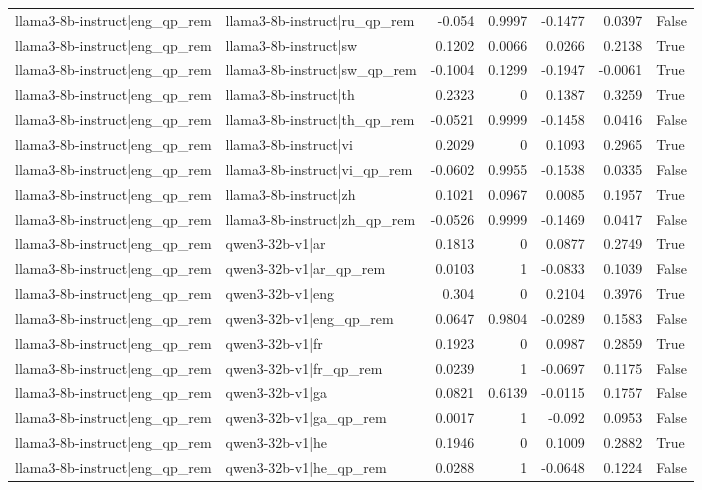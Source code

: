 \begin{table}
\begin{tabular}{l l r r r r l}
llama3-8b-instruct|eng_qp_rem & llama3-8b-instruct|ru_qp_rem & -0.054 & 0.9997 & -0.1477 & 0.0397 & False \\
llama3-8b-instruct|eng_qp_rem & llama3-8b-instruct|sw & 0.1202 & 0.0066 & 0.0266 & 0.2138 & True \\
llama3-8b-instruct|eng_qp_rem & llama3-8b-instruct|sw_qp_rem & -0.1004 & 0.1299 & -0.1947 & -0.0061 & True \\
llama3-8b-instruct|eng_qp_rem & llama3-8b-instruct|th & 0.2323 & 0 & 0.1387 & 0.3259 & True \\
llama3-8b-instruct|eng_qp_rem & llama3-8b-instruct|th_qp_rem & -0.0521 & 0.9999 & -0.1458 & 0.0416 & False \\
llama3-8b-instruct|eng_qp_rem & llama3-8b-instruct|vi & 0.2029 & 0 & 0.1093 & 0.2965 & True \\
llama3-8b-instruct|eng_qp_rem & llama3-8b-instruct|vi_qp_rem & -0.0602 & 0.9955 & -0.1538 & 0.0335 & False \\
llama3-8b-instruct|eng_qp_rem & llama3-8b-instruct|zh & 0.1021 & 0.0967 & 0.0085 & 0.1957 & True \\
llama3-8b-instruct|eng_qp_rem & llama3-8b-instruct|zh_qp_rem & -0.0526 & 0.9999 & -0.1469 & 0.0417 & False \\
llama3-8b-instruct|eng_qp_rem & qwen3-32b-v1|ar & 0.1813 & 0 & 0.0877 & 0.2749 & True \\
llama3-8b-instruct|eng_qp_rem & qwen3-32b-v1|ar_qp_rem & 0.0103 & 1 & -0.0833 & 0.1039 & False \\
llama3-8b-instruct|eng_qp_rem & qwen3-32b-v1|eng & 0.304 & 0 & 0.2104 & 0.3976 & True \\
llama3-8b-instruct|eng_qp_rem & qwen3-32b-v1|eng_qp_rem & 0.0647 & 0.9804 & -0.0289 & 0.1583 & False \\
llama3-8b-instruct|eng_qp_rem & qwen3-32b-v1|fr & 0.1923 & 0 & 0.0987 & 0.2859 & True \\
llama3-8b-instruct|eng_qp_rem & qwen3-32b-v1|fr_qp_rem & 0.0239 & 1 & -0.0697 & 0.1175 & False \\
llama3-8b-instruct|eng_qp_rem & qwen3-32b-v1|ga & 0.0821 & 0.6139 & -0.0115 & 0.1757 & False \\
llama3-8b-instruct|eng_qp_rem & qwen3-32b-v1|ga_qp_rem & 0.0017 & 1 & -0.092 & 0.0953 & False \\
llama3-8b-instruct|eng_qp_rem & qwen3-32b-v1|he & 0.1946 & 0 & 0.1009 & 0.2882 & True \\
llama3-8b-instruct|eng_qp_rem & qwen3-32b-v1|he_qp_rem & 0.0288 & 1 & -0.0648 & 0.1224 & False \\

\end{tabular}
\end{table}
